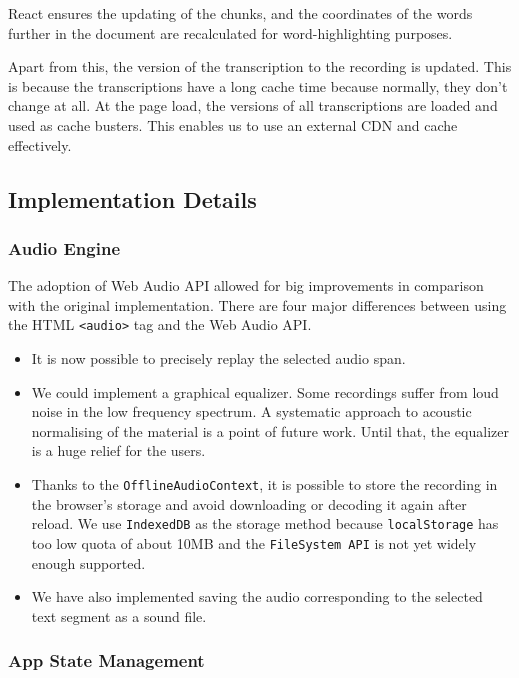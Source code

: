 \documentclass{svproc}
\begin{document}
React ensures the updating of the chunks, and the coordinates of the words
further in the document are recalculated for word-highlighting purposes.

Apart from this, the version of the transcription to the recording is updated.
This is because the transcriptions have a long cache time because normally, they
don't change at all. At the page load, the versions of all transcriptions are
loaded and used as cache busters. This enables us to use an external CDN and
cache effectively.

\subsection{Implementation Details}

\subsubsection{Audio Engine}

The adoption of Web Audio API\cite{adenot2013web} allowed for big improvements
in comparison with the original implementation. There are four major differences
between using the HTML \texttt{<audio>} tag and the Web Audio API.

\begin{itemize}
\item{It is now possible to precisely replay the selected audio span.}
\item{
    We could implement a graphical equalizer. Some recordings suffer from loud
    noise in the low frequency spectrum. A systematic approach to acoustic
    normalising of the material is a point of future work. Until that, the
    equalizer is a huge relief for the users.
}
\item{
    Thanks to the \texttt{OfflineAudioContext}, it is possible to store the
    recording in the browser's storage and avoid downloading or decoding it
    again after reload. We use \texttt{IndexedDB} as the storage method because
    \texttt{localStorage} has too low quota of about 10MB and the
    \texttt{FileSystem API} is not yet widely enough supported.
}
\item{
    We have also implemented saving the audio corresponding to the selected text
    segment as a sound file.
}
\end{itemize}

\subsubsection{App State Management}
\end{document}
